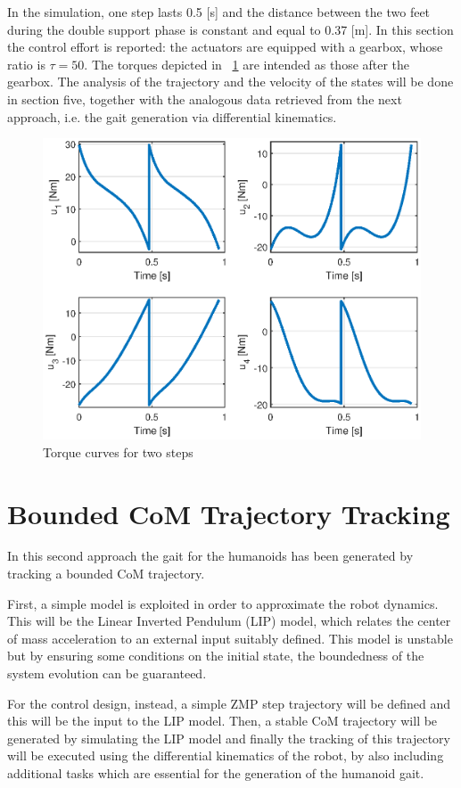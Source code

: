 \documentclass[11pt]{article}
\begin{document}
In the simulation, one step lasts 0.5 [s] and the distance between the two feet during the double support phase is constant and equal to 0.37 [m]. In this section the control effort is reported: the actuators are equipped with a gearbox, whose ratio is $\tau = 50$. The torques depicted in \figurename~\ref{torque} are intended as those after the gearbox. The analysis of the trajectory and the velocity of the states will be done in section five, together with the analogous data retrieved from the next approach, i.e. the gait generation via differential kinematics.

\begin{figure}[H]
\centering
\includegraphics[width=.8\textwidth]{Images/torques.eps}
\caption{Torque curves for two steps}
\label{torque}
\end{figure}

\section{Bounded CoM Trajectory Tracking}

In this second approach the gait for the humanoids has been generated by tracking a bounded CoM trajectory.

First, a simple model is exploited in order to approximate the robot dynamics. This will be the Linear Inverted Pendulum (LIP) model, which relates the center of mass acceleration to an external input suitably defined. This model is unstable but by ensuring some conditions on the initial state, the boundedness of the system evolution can be guaranteed.

For the control design, instead, a simple ZMP step trajectory will be defined and this will be the input to the LIP model. Then, a stable CoM trajectory will be generated by simulating the LIP model and finally the tracking of this trajectory will be executed using the differential kinematics of the robot, by also including additional tasks which are essential for the generation of the humanoid gait.
\end{document}
